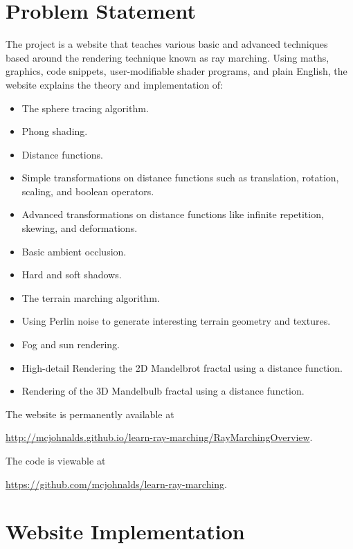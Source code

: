 \documentclass[parskip=full]{scrartcl}
\begin{document}
\section{Problem Statement}

The project is a website that teaches various basic and advanced techniques
based around the rendering technique known as ray marching. Using maths,
graphics, code snippets, user-modifiable shader programs, and plain English,
the website explains the theory and implementation of:
\begin{itemize}
    \item The sphere tracing algorithm.
    \item Phong shading.
    \item Distance functions.
    \item Simple transformations on distance functions such as translation,
        rotation, scaling, and boolean operators.
    \item Advanced transformations on distance functions like infinite
        repetition, skewing, and deformations.
    \item Basic ambient occlusion.
    \item Hard and soft shadows.
    \item The terrain marching algorithm.
    \item Using Perlin noise to generate interesting terrain geometry and
        textures.
    \item Fog and sun rendering.
    \item High-detail Rendering the 2D Mandelbrot fractal using a distance
        function.
    \item Rendering of the 3D Mandelbulb fractal using a distance function.
\end{itemize}

The website is permanently available at

\qquad\url{http://mcjohnalds.github.io/learn-ray-marching/RayMarchingOverview}.

The code is viewable at

\qquad\url{https://github.com/mcjohnalds/learn-ray-marching}.

\section{Website Implementation}
\end{document}
